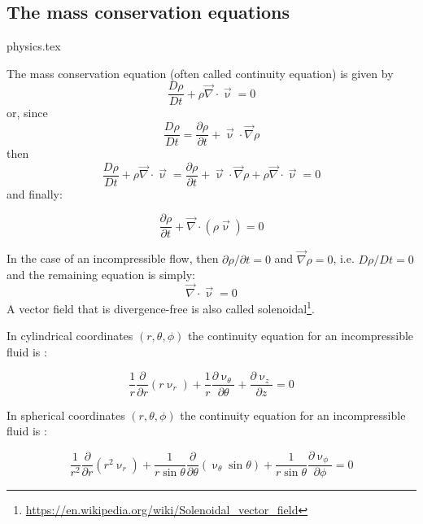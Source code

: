 \subsection{The mass conservation equations} 
\begin{flushright} {\tiny {\color{gray} physics.tex}} \end{flushright}

The mass conservation equation (often called continuity equation) is given by
\[
\frac{D\rho}{Dt} + \rho {\vec \nabla}\cdot{\vec \upnu} = 0
\]
or, since 
\[
\frac{D\rho}{Dt} = \frac{\partial \rho}{\partial t} + {\vec \upnu}\cdot {\vec \nabla}\rho
\]
then 
\[
\frac{D\rho}{Dt} + \rho {\vec \nabla}\cdot{\vec \upnu} = 
\frac{\partial \rho}{\partial t} + {\vec \upnu}\cdot {\vec \nabla}\rho
 + \rho {\vec \nabla}\cdot{\vec \upnu} = 0 
\]
and finally:
\begin{mdframed}[backgroundcolor=blue!5]
\begin{equation}
\frac{\partial \rho}{\partial t} + {\vec \nabla}\cdot(\rho {\vec \upnu}) = 0
\label{eq:massconvgen}
\end{equation}
\end{mdframed}
In the case of an incompressible flow, then $\partial \rho/\partial t=0$ and 
${\vec \nabla}\rho=0$, i.e. $D\rho/Dt=0$ and the remaining equation is simply:
\[
{\vec \nabla}\cdot{\vec \upnu} = 0
\]
A vector field that is divergence-free is also called 
solenoidal\footnote{\url{https://en.wikipedia.org/wiki/Solenoidal_vector_field}}.


In cylindrical coordinates $(r,\theta,\phi)$ 
the continuity equation for an incompressible fluid is :

\begin{mdframed}[backgroundcolor=blue!5]
\[
\frac{1}{r} \frac{\partial}{\partial r} (r \upnu_r) 
+
\frac{1}{r} \frac{\partial \upnu_\theta}{\partial \theta}
+
\frac{\partial \upnu_z}{\partial z}=0
\]
\end{mdframed}


In spherical coordinates $(r,\theta,\phi)$ 
the continuity equation for an incompressible fluid is :

\begin{mdframed}[backgroundcolor=blue!5]
\begin{equation}
\frac{1}{r^2} \frac{\partial}{\partial r} (r^2 \upnu_r) 
+
\frac{1}{r \sin\theta} \frac{\partial}{\partial \theta} (\upnu_\theta \sin\theta)
+
\frac{1}{r \sin\theta} \frac{\partial \upnu_\phi}{\partial \phi}=0
\label{eq:divsc}
\end{equation}
\end{mdframed}



